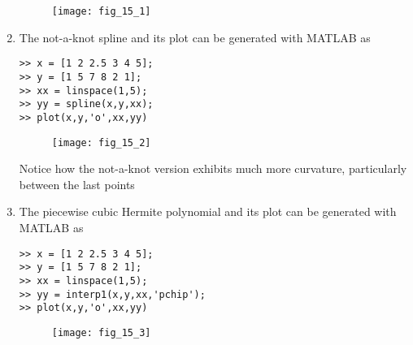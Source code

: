 \documentclass[../main.tex]{subfiles}
\begin{document}
\begin{enumerate}[label=\bfseries(\alph*)]
\begin{figure}[H]
		\texttt{[image: fig\_15\_1]}
		\label{fig:fig_15_1}
	\end{figure}
	\bigbreak
\item The not-a-knot spline and its plot can be generated with MATLAB as 
	\bigbreak
\begin{lstlisting}[numbers=none]
>> x = [1 2 2.5 3 4 5];
>> y = [1 5 7 8 2 1];
>> xx = linspace(1,5);
>> yy = spline(x,y,xx);
>> plot(x,y,'o',xx,yy)
\end{lstlisting}
	\bigbreak
	\begin{figure}[H]
		\texttt{[image: fig\_15\_2]}
		\label{fig:fig_15_2}
	\end{figure}
	\bigbreak
Notice how the not-a-knot version exhibits much more curvature, particularly between the
last points
	\bigbreak
\item 
The piecewise cubic Hermite polynomial and its plot can be generated with MATLAB as
	\bigbreak
\begin{lstlisting}[numbers=none]
>> x = [1 2 2.5 3 4 5];
>> y = [1 5 7 8 2 1];
>> xx = linspace(1,5);
>> yy = interp1(x,y,xx,'pchip');
>> plot(x,y,'o',xx,yy)
\end{lstlisting}
	\bigbreak
	\begin{figure}[H]
		\texttt{[image: fig\_15\_3]}
		\label{fig:fig_15_3}
	\end{figure}
	\bigbreak




\end{enumerate}
\end{document}
